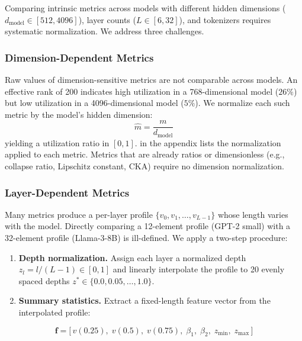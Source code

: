 \documentclass[preprint]{neurips_2025}
\begin{document}
Comparing intrinsic metrics across models with different hidden dimensions ($d_{\text{model}} \in [512, 4096]$), layer counts ($L \in [6, 32]$), and tokenizers requires systematic normalization. We address three challenges.

\subsubsection{Dimension-Dependent Metrics}
\label{sec:norm-dim}

Raw values of dimension-sensitive metrics are not comparable across models. An effective rank of 200 indicates high utilization in a 768-dimensional model ($26\%$) but low utilization in a 4096-dimensional model ($5\%$).
We normalize each such metric by the model's hidden dimension:
\begin{equation}
  \hat{m} = \frac{m}{d_{\text{model}}}
  \label{eq:dim-norm}
\end{equation}
yielding a utilization ratio in $[0, 1]$.
 in the appendix lists the normalization applied to each metric.
Metrics that are already ratios or dimensionless (e.g., collapse ratio, Lipschitz constant, CKA) require no dimension normalization.

\subsubsection{Layer-Dependent Metrics}
\label{sec:norm-layer}

Many metrics produce a per-layer profile $\{v_0, v_1, \ldots, v_{L-1}\}$ whose length varies with the model.
Directly comparing a 12-element profile (GPT-2 small) with a 32-element profile (Llama-3-8B) is ill-defined.
We apply a two-step procedure:

\begin{enumerate}
  \item \textbf{Depth normalization.} Assign each layer a normalized depth $z_l = l / (L-1) \in [0, 1]$ and linearly interpolate the profile to 20 evenly spaced depths $z^* \in \{0.0, 0.05, \ldots, 1.0\}$.
  \item \textbf{Summary statistics.} Extract a fixed-length feature vector from the interpolated profile:
\end{enumerate}

\begin{equation}
  \mathbf{f} = \bigl[\, v(0.25),\; v(0.5),\; v(0.75),\; \beta_1,\; \beta_2,\; z_{\min},\; z_{\max} \,\bigr]
  \label{eq:layer-features}
\end{equation}
\end{document}

